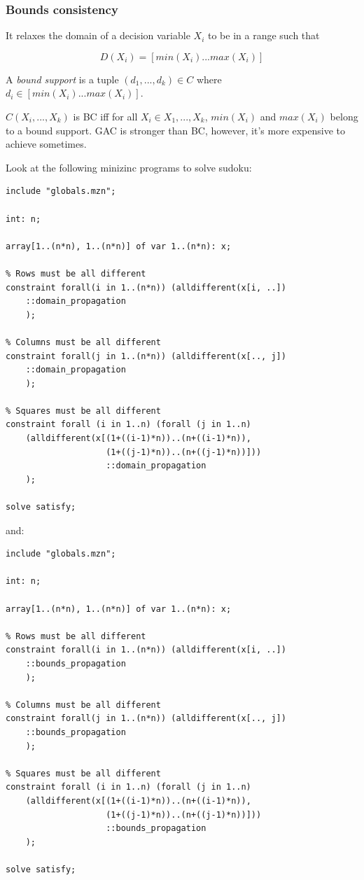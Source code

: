 \documentclass[10pt,a4paper]{article}
\begin{document}
\subsubsection{Bounds consistency}
It relaxes the domain of a decision variable $X_i$ to be in a range such that

\[ D(X_i) = [min(X_i)...max(X_i)] \]

A \textit{bound support} is a tuple $(d_1, ..., d_k) \in C$ where
$d_i \in [min(X_i)...max(X_i)]$.

$C(X_i, ..., X_k)$ is BC iff for all $X_i \in {X_1, ..., X_k}$, $min(X_i)$ and
$max(X_i)$ belong to a bound support. GAC is stronger than BC, however, it's
more expensive to achieve sometimes.

Look at the following minizinc programs to solve sudoku:

\begin{lstlisting}[style=none]
include "globals.mzn";

int: n;

array[1..(n*n), 1..(n*n)] of var 1..(n*n): x;

% Rows must be all different
constraint forall(i in 1..(n*n)) (alldifferent(x[i, ..])
    ::domain_propagation
    );

% Columns must be all different
constraint forall(j in 1..(n*n)) (alldifferent(x[.., j])
    ::domain_propagation
    );

% Squares must be all different
constraint forall (i in 1..n) (forall (j in 1..n)
	(alldifferent(x[(1+((i-1)*n))..(n+((i-1)*n)),
                    (1+((j-1)*n))..(n+((j-1)*n))]))
                    ::domain_propagation
	);

solve satisfy;
\end{lstlisting}

and:

\begin{lstlisting}[style=none]
include "globals.mzn";

int: n;

array[1..(n*n), 1..(n*n)] of var 1..(n*n): x;

% Rows must be all different
constraint forall(i in 1..(n*n)) (alldifferent(x[i, ..])
    ::bounds_propagation
    );

% Columns must be all different
constraint forall(j in 1..(n*n)) (alldifferent(x[.., j])
    ::bounds_propagation
    );

% Squares must be all different
constraint forall (i in 1..n) (forall (j in 1..n)
	(alldifferent(x[(1+((i-1)*n))..(n+((i-1)*n)),
                    (1+((j-1)*n))..(n+((j-1)*n))]))
                    ::bounds_propagation
	);

solve satisfy;
\end{lstlisting}
\end{document}
